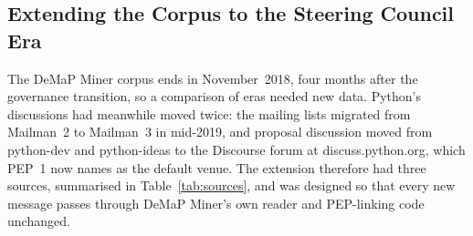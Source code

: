 \subsection{Extending the Corpus to the Steering Council Era}
\label{sec:extension}

The DeMaP Miner corpus ends in November~2018, four months after the governance transition, so a comparison of eras needed new data. Python's discussions had meanwhile moved twice: the mailing lists migrated from Mailman~2 to Mailman~3 in mid-2019, and proposal discussion moved from python-dev and python-ideas to the Discourse forum at discuss.python.org, which PEP~1 now names as the default venue. The extension therefore had three sources, summarised in Table~\ref{tab:sources}, and was designed so that every new message passes through DeMaP Miner's own reader and PEP-linking code unchanged.

\begin{table}[t]
\caption{Sources of the corpus extension (November~2018 to September~2026).}
\label{tab:sources}
\footnotesize
\setlength{\tabcolsep}{3.5pt}
\end{table}

